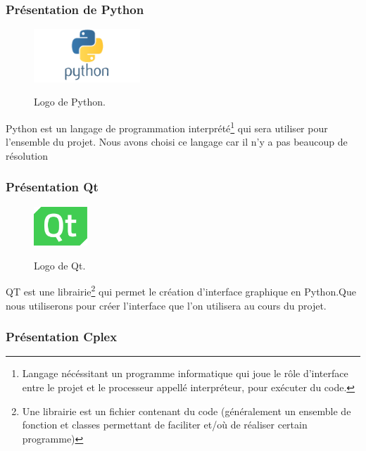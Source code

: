 \subsubsection{Présentation de Python}

\begin{figure}[h]
  \begin{center}
  \includegraphics[width=4cm]{./images/Python_Logo.png}\label{Python}
  \caption{Logo de Python.}
  \end{center}
\end{figure}

Python est un langage de programmation interprété\footnote{\label{interprete}Langage nécéssitant un programme informatique qui joue le rôle d’interface entre le projet et le processeur appellé interpréteur, pour exécuter du code.} qui sera utiliser pour l'ensemble du projet. Nous avons choisi ce langage car il n'y a pas beaucoup de résolution

\subsubsection{Présentation Qt}

\begin{figure}[h]
  \begin{center}
  \includegraphics[width=2cm]{./images/Qt_logo_2016.png}\label{Qt}
  \caption{Logo de Qt.}
  \end{center}
\end{figure}

QT est une librairie\footnote{\label{librairie}Une librairie est un fichier contenant du code (généralement un ensemble de fonction et classes permettant de faciliter et/où de réaliser certain programme)} qui permet le création d'interface graphique en Python.Que nous utiliserons pour créer l'interface que l'on utilisera au cours du projet.

\subsubsection{Présentation Cplex}

